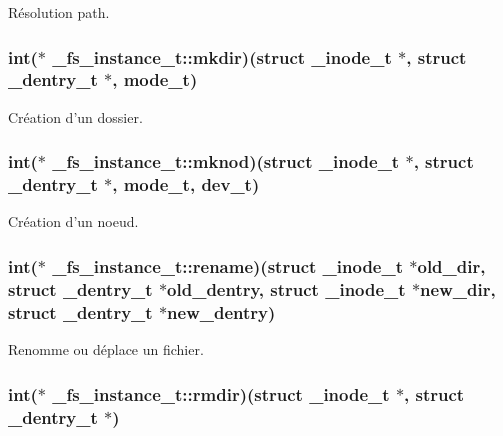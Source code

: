 Résolution path. \hypertarget{struct__fs__instance__t_a705d100026840b619f217931dc8419f3}{
\subsubsection[{mkdir}]{\setlength{\rightskip}{0pt plus 5cm}int($\ast$ \-\_\-fs\-\_\-instance\-\_\-t\-::mkdir)(struct {\bf \-\_\-inode\-\_\-t} $\ast$, struct {\bf \-\_\-dentry\-\_\-t} $\ast$, {\bf mode\-\_\-t})}}\label{struct__fs__instance__t_a705d100026840b619f217931dc8419f3}
Création d'un dossier. \hypertarget{struct__fs__instance__t_ae57436a3bfd6de530204a67a8ac2f4f0}{
\subsubsection[{mknod}]{\setlength{\rightskip}{0pt plus 5cm}int($\ast$ \-\_\-fs\-\_\-instance\-\_\-t\-::mknod)(struct {\bf \-\_\-inode\-\_\-t} $\ast$, struct {\bf \-\_\-dentry\-\_\-t} $\ast$, {\bf mode\-\_\-t}, {\bf dev\-\_\-t})}}\label{struct__fs__instance__t_ae57436a3bfd6de530204a67a8ac2f4f0}
Création d'un noeud. \hypertarget{struct__fs__instance__t_a62e37513c47dda9d11e534cf84d6f48b}{
\subsubsection[{rename}]{\setlength{\rightskip}{0pt plus 5cm}int($\ast$ \-\_\-fs\-\_\-instance\-\_\-t\-::rename)(struct {\bf \-\_\-inode\-\_\-t} $\ast$old\-\_\-dir, struct {\bf \-\_\-dentry\-\_\-t} $\ast$old\-\_\-dentry, struct {\bf \-\_\-inode\-\_\-t} $\ast$new\-\_\-dir, struct {\bf \-\_\-dentry\-\_\-t} $\ast$new\-\_\-dentry)}}\label{struct__fs__instance__t_a62e37513c47dda9d11e534cf84d6f48b}
Renomme ou déplace un fichier. \hypertarget{struct__fs__instance__t_a4ceb71ff00d0a5fda03aa644c4694bef}{
\subsubsection[{rmdir}]{\setlength{\rightskip}{0pt plus 5cm}int($\ast$ \-\_\-fs\-\_\-instance\-\_\-t\-::rmdir)(struct {\bf \-\_\-inode\-\_\-t} $\ast$, struct {\bf \-\_\-dentry\-\_\-t} $\ast$)}}\label{struct__fs__instance__t_a4ceb71ff00d0a5fda03aa644c4694bef}
